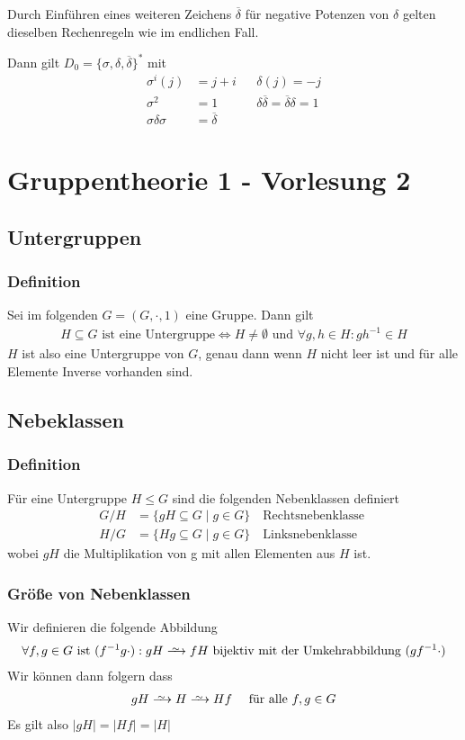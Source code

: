\documentclass[12pt, german]{article}
\newcommand\iso{\xrightarrow{
		\,\smash{\raisebox{-0.65ex}{\ensuremath{\scriptstyle\sim}}}\,}}
\begin{document}
		Durch Einführen eines weiteren Zeichens $\overline{\delta}$ für negative Potenzen von $\delta$ gelten dieselben Rechenregeln wie im endlichen Fall.
		
		Dann gilt $D_0 = \{\sigma, \delta, \overline{\delta}\}^*$ mit
		\begin{align*}
			\sigma^i(j) & = j+i &&\delta(j)  = -j \\
			\sigma^2 & = 1 &&\delta\overline{\delta} = \overline{\delta}\delta = 1 \\
			\sigma\delta\sigma & = \overline{\delta}
		\end{align*}

	\section{Gruppentheorie 1 - Vorlesung 2}
	\subsection{Untergruppen}
	\subsubsection{Definition}
	Sei im folgenden $G=(G, \cdot, 1)$ eine Gruppe. Dann gilt 
	\begin{align*}
		H \subseteq G \text{ ist eine Untergruppe} \iff H \not = \emptyset \text{ und } \forall g, h \in H : gh^{-1} \in H
	\end{align*}
	$H$ ist also eine Untergruppe von $G$, genau dann wenn $H$ nicht leer ist und für alle Elemente Inverse vorhanden sind.  
	
	
	\subsection{Nebeklassen}
	\subsubsection{Definition}
	Für eine Untergruppe $H \leq G$ sind die folgenden Nebenklassen definiert
	\begin{align*}
		G/H &= \{gH \subseteq G \mid g \in G\} \quad \text{Rechtsnebenklasse } \\
		H/G &= \{Hg \subseteq G \mid g \in G\} \quad \text{Linksnebenklasse } 
	\end{align*}
	wobei $gH$ die Multiplikation von  g mit allen Elementen aus $H$ ist. 
	
	\subsubsection{Größe von Nebenklassen}
	Wir definieren die folgende Abbildung
	\begin{align*}
		\forall f,g \in G \text{ ist } (f^{-1}g \cdot): gH \iso fH \text{ bijektiv mit der Umkehrabbildung } (gf^{-1}\cdot)
	\end{align*}
	Wir können dann folgern dass 
	\begin{align*}
		gH \iso H \iso Hf \quad \text{ für alle } f,g \in G
	\end{align*}
	Es gilt also $|gH| = |Hf| = |H|$
	
\end{document}
